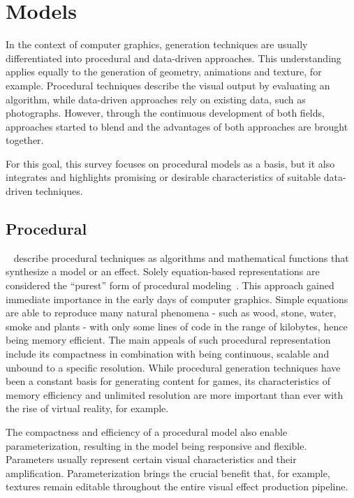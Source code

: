 

\section{Models}
\label{sec:models}

In the context of computer graphics, generation techniques are usually differentiated into procedural and data-driven approaches. This understanding applies equally to the generation of geometry, animations and texture, for example. Procedural techniques describe the visual output by evaluating an algorithm, while data-driven approaches rely on existing data, such as photographs. However, through the continuous development of both fields, approaches started to blend and the advantages of both approaches are brought together. 

For this goal, this survey focuses on procedural models as a basis, but it also integrates and highlights promising or desirable characteristics of suitable data-driven techniques.

\subsection{Procedural}
\label{subsec:models_procedural}

\citeauthor*{ebert_2003_tmp}~\cite{ebert_2003_tmp} describe procedural techniques as algorithms and mathematical functions that synthesize a model or an effect. Solely equation-based representations are considered the ``purest'' form of procedural modeling~\cite{smelik_2014_aso}. This approach gained immediate importance in the early days of computer graphics. Simple equations are able to reproduce many natural phenomena - such as wood, stone, water, smoke and plants - with only some lines of code in the range of kilobytes, hence being memory efficient. The main appeals of such procedural representation include its compactness in combination with being continuous, scalable and unbound to a specific resolution. While procedural generation techniques have been a constant basis for generating content for games, its characteristics of memory efficiency and unlimited resolution are more important than ever with the rise of virtual reality, for example.

The compactness and efficiency of a procedural model also enable parameterization, resulting in the model being responsive and flexible. Parameters usually represent certain visual characteristics and their amplification. Parameterization brings the crucial benefit that, for example, textures remain editable throughout the entire visual effect production pipeline.

